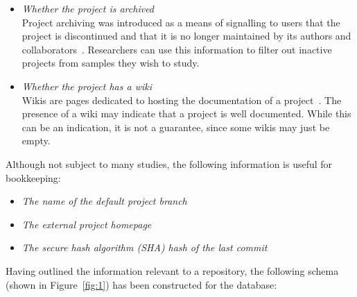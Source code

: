 \begin{itemize}
    \item \textit{Whether the project is archived}
    \\Project archiving was introduced as a means of signalling to users that the project is discontinued and that it is no longer maintained by its authors and collaborators~\cite{ARCHIVINGREPOS}. Researchers can use this information to filter out inactive projects from samples they wish to study.
    \item \textit{Whether the project has a wiki}
    \\Wikis are pages dedicated to hosting the documentation of a project~\cite{WIKIS}. The presence of a wiki may indicate that a project is well documented. While this can be an indication, it is not a guarantee, since some wikis may just be empty.
\end{itemize}

\noindent
Although not subject to many studies, the following information is useful for bookkeeping:

\begin{itemize}
    \item \textit{The name of the default project branch}
    \item \textit{The external project homepage}
    \item \textit{The secure hash algorithm (SHA) hash of the last commit}
\end{itemize}

\newpage

\noindent
Having outlined the information relevant to a repository, the following schema (shown in Figure~\ref{fig:1}) has been constructed for the database:

